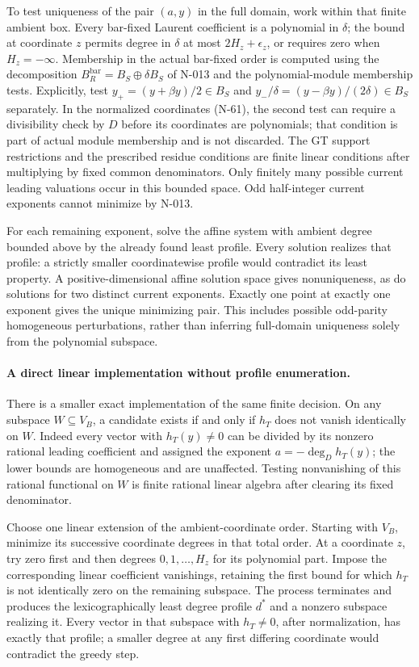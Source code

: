 To test uniqueness of the pair $(a,y)$ in the full domain,
work within that finite ambient box.  Every bar-fixed
Laurent coefficient is a polynomial in $\delta$; the bound
at coordinate $z$ permits degree in $\delta$ at most
$2H_z+\epsilon_z$, or requires zero when $H_z=-\infty$.
Membership in the actual bar-fixed order is computed using
the decomposition $B_R^{\mathrm{bar}}=B_S\oplus\delta B_S$
of N-013 and the polynomial-module membership tests.
Explicitly, test $y_+=(y+\beta y)/2\in B_S$ and
$y_-/\delta=(y-\beta y)/(2\delta)\in B_S$ separately.
In the normalized coordinates (N-61), the second test can
require a divisibility check by $D$ before its coordinates
are polynomials; that condition is part of actual module
membership and is not discarded.
The GT support restrictions and the prescribed residue
conditions are finite linear conditions after multiplying
by fixed common denominators.  Only finitely many possible
current leading valuations occur in this bounded space.
Odd half-integer current exponents cannot minimize by N-013.

For each remaining exponent, solve the affine system with
ambient degree bounded above by the already found least
profile.  Every solution realizes that profile: a strictly
smaller coordinatewise profile would contradict its least
property.  A positive-dimensional affine solution space
gives nonuniqueness, as do solutions for two distinct
current exponents.  Exactly one point at exactly one
exponent gives the unique minimizing pair.  This includes
possible odd-parity homogeneous perturbations, rather
than inferring full-domain uniqueness solely from the
polynomial subspace.

\paragraph{A direct linear implementation without profile enumeration.}
There is a smaller exact implementation of the same finite
decision.  On any subspace $W\subseteq V_B$, a candidate
exists if and only if $h_T$ does not vanish identically on
$W$.  Indeed every vector with $h_T(y)\ne0$ can be divided
by its nonzero rational leading coefficient and assigned
the exponent $a=-\deg_D h_T(y)$; the lower bounds are
homogeneous and are unaffected.  Testing nonvanishing of
this rational functional on $W$ is finite rational linear
algebra after clearing its fixed denominator.

Choose one linear extension of the ambient-coordinate order.
Starting with $V_B$, minimize its successive coordinate
degrees in that total order.  At a coordinate $z$, try zero
first and then degrees $0,1,\ldots,H_z$ for its polynomial
part.  Impose the corresponding linear coefficient
vanishings, retaining the first bound for which $h_T$ is
not identically zero on the remaining subspace.  The process
terminates and produces the lexicographically least degree
profile $d^*$ and a nonzero subspace realizing it.  Every
vector in that subspace with $h_T\ne0$, after normalization,
has exactly that profile; a smaller degree at any first
differing coordinate would contradict the greedy step.

